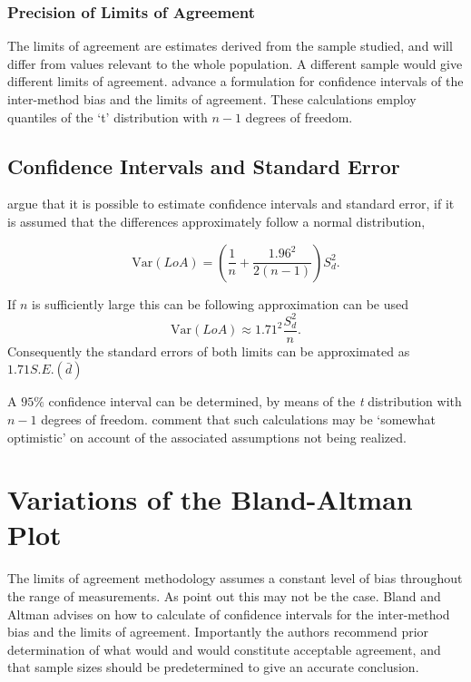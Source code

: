 \documentclass[12pt, a4paper]{report}
\theoremstyle{plain}
\theoremstyle{definition}
\theoremstyle{remark}
\begin{document}

		

\subsubsection{Precision of Limits of Agreement}
The limits of agreement are estimates derived from the sample
studied, and will differ from values relevant to the whole
population. A different sample would give different limits of
agreement. \citet*{BA86} advance a formulation for confidence
intervals of the inter-method bias and the limits of agreement.
These calculations employ quantiles of the `t' distribution with
$n -1$ degrees of freedom.



\subsection{Confidence Intervals and Standard Error}
\citet*{BA99} argue that it is possible to estimate confidence
intervals and standard error, if it is assumed that the
differences approximately follow a normal distribution,

\begin{equation}
\mbox{Var}(LoA) = (\frac{1}{n}+\frac{1.96^{2}}{2(n-1)})S_{d}^{2}.
\end{equation}

If $n$ is sufficiently large this can be following approximation
can be used
\begin{equation}
\mbox{Var}(LoA) \approx 1.71^{2}\frac{S_{d}^{2}}{n}.
\end{equation}
Consequently the standard errors of both limits can be
approximated as $1.71 S.E.(\bar{d})$

A $95\%$ confidence interval can be determined, by means of the
\emph{t} distribution with $n-1$ degrees of freedom. \citet*{BA99} comment that such calculations  may be `somewhat
optimistic' on account of the associated assumptions not being
realized.


\section{Variations of the Bland-Altman Plot} 
The limits of agreement methodology assumes a constant level of bias throughout the range of measurements. As \citet*{BA86} point out this may not be the case. Bland and Altman advises on how to calculate of confidence intervals for the inter-method bias and
the limits of agreement. Importantly the authors recommend prior determination of what would and would constitute acceptable
agreement, and that sample sizes should be predetermined to give an accurate conclusion.
\end{document}
